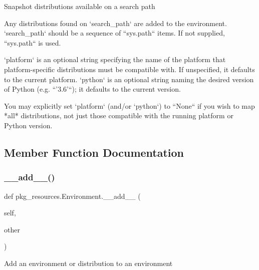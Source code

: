 \begin{DoxyVerb}Snapshot distributions available on a search path

Any distributions found on `search_path` are added to the environment.
`search_path` should be a sequence of ``sys.path`` items.  If not
supplied, ``sys.path`` is used.

`platform` is an optional string specifying the name of the platform
that platform-specific distributions must be compatible with.  If
unspecified, it defaults to the current platform.  `python` is an
optional string naming the desired version of Python (e.g. ``'3.6'``);
it defaults to the current version.

You may explicitly set `platform` (and/or `python`) to ``None`` if you
wish to map *all* distributions, not just those compatible with the
running platform or Python version.
\end{DoxyVerb}
 

\subsection{Member Function Documentation}
\mbox{\label{classpkg__resources_1_1Environment_a8f9750420dd62e8b71b0b2f06f424c57}} 
\subsubsection{\texorpdfstring{\+\_\+\+\_\+add\+\_\+\+\_\+()}{\_\_add\_\_()}}
{\footnotesize\ttfamily def pkg\+\_\+resources.\+Environment.\+\_\+\+\_\+add\+\_\+\+\_\+ (\begin{DoxyParamCaption}\item[{}]{self,  }\item[{}]{other }\end{DoxyParamCaption})}

\begin{DoxyVerb}Add an environment or distribution to an environment\end{DoxyVerb}
 \mbox{\label{classpkg__resources_1_1Environment_af401af1f867613b8f268ab93a1275aff}} 
